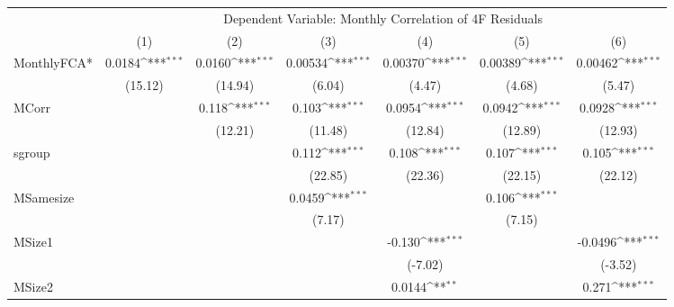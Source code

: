 {
\def\sym#1{\ifmmode^{#1}\else\(^{#1}\)\fi}
\begin{tabular}{l*{6}{c}}
\hline\hline
 & \multicolumn{6}{c}{Dependent Variable: Monthly Correlation of 4F Residuals}                 \\
 \cline{2-7}
                    &\multicolumn{1}{c}{(1)}         &\multicolumn{1}{c}{(2)}         &\multicolumn{1}{c}{(3)}         &\multicolumn{1}{c}{(4)}         &\multicolumn{1}{c}{(5)}         &\multicolumn{1}{c}{(6)}         \\
\hline
MonthlyFCA*         &      0.0184\sym{***}&      0.0160\sym{***}&     0.00534\sym{***}&     0.00370\sym{***}&     0.00389\sym{***}&     0.00462\sym{***}\\
                    &     (15.12)         &     (14.94)         &      (6.04)         &      (4.47)         &      (4.68)         &      (5.47)         \\
[1em]
MCorr               &                     &       0.118\sym{***}&       0.103\sym{***}&      0.0954\sym{***}&      0.0942\sym{***}&      0.0928\sym{***}\\
                    &                     &     (12.21)         &     (11.48)         &     (12.84)         &     (12.89)         &     (12.93)         \\
[1em]
sgroup              &                     &                     &       0.112\sym{***}&       0.108\sym{***}&       0.107\sym{***}&       0.105\sym{***}\\
                    &                     &                     &     (22.85)         &     (22.36)         &     (22.15)         &     (22.12)         \\
[1em]
MSamesize           &                     &                     &      0.0459\sym{***}&                     &       0.106\sym{***}&                     \\
                    &                     &                     &      (7.17)         &                     &      (7.15)         &                     \\
[1em]
MSize1              &                     &                     &                     &      -0.130\sym{***}&                     &     -0.0496\sym{***}\\
                    &                     &                     &                     &     (-7.02)         &                     &     (-3.52)         \\
[1em]
MSize2              &                     &                     &                     &      0.0144\sym{**} &                     &       0.271\sym{***}\\

\end{tabular}}
